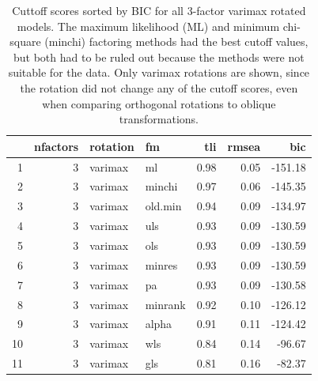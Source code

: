 \documentclass[020-persona\_validation.tex]{subfiles}
\begin{document}
        \begin{table}[ht]
            \centering
            \caption[Factoring methods for 3-factor model cutoffs]
            {Cuttoff scores sorted by BIC for all 3-factor varimax rotated models.
             The maximum likelihood (ML) and minimum chi-square (minchi) factoring methods
             had the best cutoff values,
             but both had to be ruled out because the methods were not suitable for the data.
             Only varimax rotations are shown, since the rotation did not change any of the cutoff scores,
             even when comparing orthogonal rotations to oblique transformations.
            }
            \begin{tabular}{rrllrrr}
                \hline
                & nfactors & rotation & fm & tli & rmsea & bic \\
                \hline
                1 &   3 & varimax & ml & 0.98 & 0.05 & -151.18 \\
                2 &   3 & varimax & minchi & 0.97 & 0.06 & -145.35 \\
                3 &   3 & varimax & old.min & 0.94 & 0.09 & -134.97 \\
                4 &   3 & varimax & uls & 0.93 & 0.09 & -130.59 \\
                5 &   3 & varimax & ols & 0.93 & 0.09 & -130.59 \\
                6 &   3 & varimax & minres & 0.93 & 0.09 & -130.59 \\
                7 &   3 & varimax & pa & 0.93 & 0.09 & -130.58 \\
                8 &   3 & varimax & minrank & 0.92 & 0.10 & -126.12 \\
                9 &   3 & varimax & alpha & 0.91 & 0.11 & -124.42 \\
                10 &   3 & varimax & wls & 0.84 & 0.14 & -96.67 \\
                11 &   3 & varimax & gls & 0.81 & 0.16 & -82.37 \\
                \hline
            \end{tabular}
            \label{tab:all-good-3fa-varimax-models} %
        \end{table}
\end{document}
